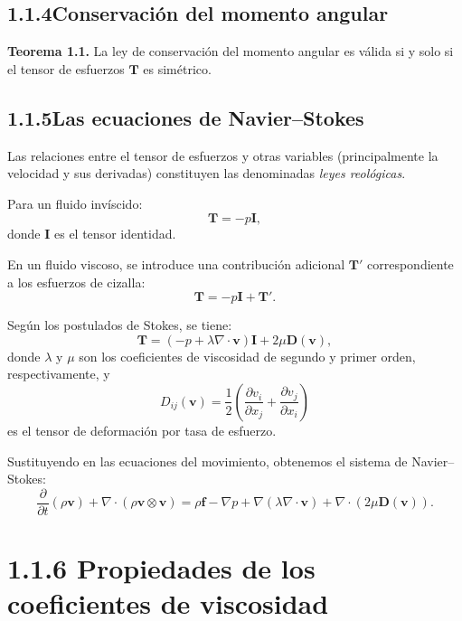 \documentclass[12pt,a4paper]{article}
\begin{document}
\subsection*{1.1.4\quad Conservación del momento angular}

\textbf{Teorema 1.1.} La ley de conservación del momento angular es válida si y solo si el tensor de esfuerzos $\mathbf{T}$ es simétrico.

\subsection*{1.1.5\quad Las ecuaciones de Navier--Stokes}

Las relaciones entre el tensor de esfuerzos y otras variables (principalmente la velocidad y sus derivadas) constituyen las denominadas \textit{leyes reológicas}.

Para un fluido invíscido:
\begin{equation}
\mathbf{T} = -p \mathbf{I},
\end{equation}
donde $\mathbf{I}$ es el tensor identidad.

En un fluido viscoso, se introduce una contribución adicional $\mathbf{T}'$ correspondiente a los esfuerzos de cizalla:
\begin{equation}
\mathbf{T} = -p \mathbf{I} + \mathbf{T}'.
\end{equation}

Según los postulados de Stokes, se tiene:
\begin{equation}
\mathbf{T} = (-p + \lambda \nabla \cdot \mathbf{v}) \mathbf{I} + 2\mu \mathbf{D}(\mathbf{v}),
\end{equation}
donde $\lambda$ y $\mu$ son los coeficientes de viscosidad de segundo y primer orden, respectivamente, y
\begin{equation}
D_{ij}(\mathbf{v}) = \frac{1}{2} \left( \frac{\partial v_i}{\partial x_j} + \frac{\partial v_j}{\partial x_i} \right)
\end{equation}
es el tensor de deformación por tasa de esfuerzo.

Sustituyendo en las ecuaciones del movimiento, obtenemos el sistema de Navier--Stokes:
\begin{equation}
\frac{\partial}{\partial t}(\rho \mathbf{v}) + \nabla \cdot (\rho \mathbf{v} \otimes \mathbf{v}) = \rho \mathbf{f} - \nabla p + \nabla (\lambda \nabla \cdot \mathbf{v}) + \nabla \cdot (2\mu \mathbf{D}(\mathbf{v})).
\end{equation}

\section*{1.1.6 Propiedades de los coeficientes de viscosidad}
\end{document}
